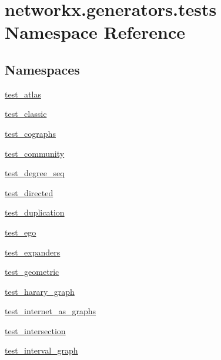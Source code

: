 \hypertarget{namespacenetworkx_1_1generators_1_1tests}{}\section{networkx.\+generators.\+tests Namespace Reference}
\label{namespacenetworkx_1_1generators_1_1tests}
\subsection*{Namespaces}
\begin{DoxyCompactItemize}
\item 
 \hyperlink{namespacenetworkx_1_1generators_1_1tests_1_1test__atlas}{test\+\_\+atlas}
\item 
 \hyperlink{namespacenetworkx_1_1generators_1_1tests_1_1test__classic}{test\+\_\+classic}
\item 
 \hyperlink{namespacenetworkx_1_1generators_1_1tests_1_1test__cographs}{test\+\_\+cographs}
\item 
 \hyperlink{namespacenetworkx_1_1generators_1_1tests_1_1test__community}{test\+\_\+community}
\item 
 \hyperlink{namespacenetworkx_1_1generators_1_1tests_1_1test__degree__seq}{test\+\_\+degree\+\_\+seq}
\item 
 \hyperlink{namespacenetworkx_1_1generators_1_1tests_1_1test__directed}{test\+\_\+directed}
\item 
 \hyperlink{namespacenetworkx_1_1generators_1_1tests_1_1test__duplication}{test\+\_\+duplication}
\item 
 \hyperlink{namespacenetworkx_1_1generators_1_1tests_1_1test__ego}{test\+\_\+ego}
\item 
 \hyperlink{namespacenetworkx_1_1generators_1_1tests_1_1test__expanders}{test\+\_\+expanders}
\item 
 \hyperlink{namespacenetworkx_1_1generators_1_1tests_1_1test__geometric}{test\+\_\+geometric}
\item 
 \hyperlink{namespacenetworkx_1_1generators_1_1tests_1_1test__harary__graph}{test\+\_\+harary\+\_\+graph}
\item 
 \hyperlink{namespacenetworkx_1_1generators_1_1tests_1_1test__internet__as__graphs}{test\+\_\+internet\+\_\+as\+\_\+graphs}
\item 
 \hyperlink{namespacenetworkx_1_1generators_1_1tests_1_1test__intersection}{test\+\_\+intersection}
\item 
 \hyperlink{namespacenetworkx_1_1generators_1_1tests_1_1test__interval__graph}{test\+\_\+interval\+\_\+graph}

\end{DoxyCompactItemize}
